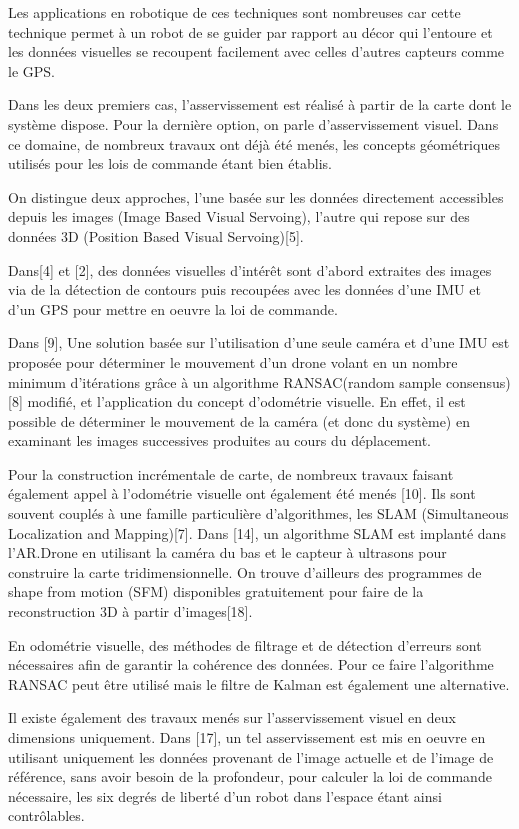 \documentclass[10pt,a4paper]{report}
\begin{document}
			
	
		Les applications en robotique de ces techniques sont nombreuses car cette technique permet à un robot de se guider par rapport au décor qui l'entoure et les données visuelles se recoupent facilement avec celles d'autres capteurs comme le GPS.
	
		Dans les deux premiers cas, l'asservissement est réalisé à partir de la carte dont le système dispose. Pour la dernière option, on parle d'asservissement visuel. Dans ce domaine, de nombreux travaux ont déjà été menés, les concepts géométriques utilisés pour les lois de commande étant bien établis. 
		
	On distingue deux approches, l'une basée sur les données directement accessibles depuis les images (Image Based Visual Servoing), l'autre qui repose sur des données 3D (Position Based Visual Servoing)[5].

		Dans[4] et [2], des données visuelles d'intérêt sont d'abord extraites des images via de la détection de contours puis recoupées avec les données d'une IMU et d'un GPS pour mettre en oeuvre la loi de commande. 
	
		Dans [9], Une solution basée sur l'utilisation d'une seule caméra et d'une IMU est proposée pour déterminer le mouvement d'un drone volant en un nombre minimum d'itérations grâce à un algorithme RANSAC(random sample consensus) 
[8] modifié, et l'application du concept d'odométrie visuelle. En effet, il est possible de déterminer le mouvement de la caméra (et donc du système) en examinant les images successives produites au cours du déplacement.
	
		Pour la construction incrémentale de carte, de nombreux travaux faisant également appel à l'odométrie visuelle ont également été menés [10]. Ils sont souvent couplés à une famille particulière d'algorithmes, les SLAM (Simultaneous Localization and Mapping)[7]. Dans [14], un algorithme SLAM est implanté dans l'AR.Drone en utilisant la caméra du bas et le capteur à ultrasons pour construire la carte tridimensionnelle. On trouve d'ailleurs des programmes de shape from motion (SFM) disponibles gratuitement pour faire de la reconstruction 3D à partir d'images[18].
	
		En odométrie visuelle, des méthodes de filtrage et de détection d'erreurs sont nécessaires afin de garantir la cohérence des données. Pour ce faire l'algorithme RANSAC peut être utilisé mais le filtre de Kalman est également une alternative.
	
		Il existe également des travaux menés sur  l'asservissement visuel en deux dimensions uniquement. Dans [17], un tel asservissement est mis en oeuvre en utilisant uniquement les données provenant de l'image actuelle et de l'image de référence, sans avoir besoin de la profondeur, pour calculer la loi de commande nécessaire, les six degrés de liberté d'un robot dans l'espace étant ainsi contrôlables.
	
\end{document}
